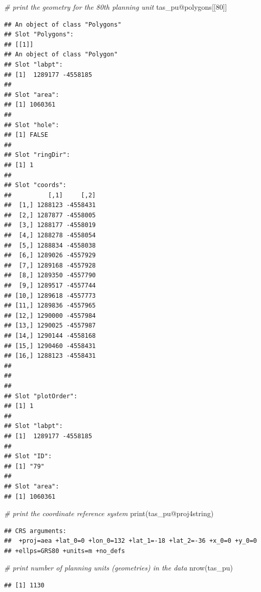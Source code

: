 \documentclass[
  12pt,
]{book}
\newenvironment{Shaded}{\begin{snugshade}}{\end{snugshade}}
\newcommand{\CommentTok}[1]{\textcolor[rgb]{0.56,0.35,0.01}{\textit{#1}}}
\newcommand{\DecValTok}[1]{\textcolor[rgb]{0.00,0.00,0.81}{#1}}
\newcommand{\FunctionTok}[1]{\textcolor[rgb]{0.00,0.00,0.00}{#1}}
\newcommand{\NormalTok}[1]{#1}
\newcommand{\SpecialCharTok}[1]{\textcolor[rgb]{0.00,0.00,0.00}{#1}}
\begin{document}
\begin{Shaded}
\begin{Highlighting}[]
\CommentTok{\# print the geometry for the 80th planning unit}
\NormalTok{tas\_pu}\SpecialCharTok{@}\NormalTok{polygons[[}\DecValTok{80}\NormalTok{]]}
\end{Highlighting}
\end{Shaded}

\begin{verbatim}
## An object of class "Polygons"
## Slot "Polygons":
## [[1]]
## An object of class "Polygon"
## Slot "labpt":
## [1]  1289177 -4558185
## 
## Slot "area":
## [1] 1060361
## 
## Slot "hole":
## [1] FALSE
## 
## Slot "ringDir":
## [1] 1
## 
## Slot "coords":
##          [,1]     [,2]
##  [1,] 1288123 -4558431
##  [2,] 1287877 -4558005
##  [3,] 1288177 -4558019
##  [4,] 1288278 -4558054
##  [5,] 1288834 -4558038
##  [6,] 1289026 -4557929
##  [7,] 1289168 -4557928
##  [8,] 1289350 -4557790
##  [9,] 1289517 -4557744
## [10,] 1289618 -4557773
## [11,] 1289836 -4557965
## [12,] 1290000 -4557984
## [13,] 1290025 -4557987
## [14,] 1290144 -4558168
## [15,] 1290460 -4558431
## [16,] 1288123 -4558431
## 
## 
## 
## Slot "plotOrder":
## [1] 1
## 
## Slot "labpt":
## [1]  1289177 -4558185
## 
## Slot "ID":
## [1] "79"
## 
## Slot "area":
## [1] 1060361
\end{verbatim}

\begin{Shaded}
\begin{Highlighting}[]
\CommentTok{\# print the coordinate reference system}
\FunctionTok{print}\NormalTok{(tas\_pu}\SpecialCharTok{@}\NormalTok{proj4string)}
\end{Highlighting}
\end{Shaded}

\begin{verbatim}
## CRS arguments:
##  +proj=aea +lat_0=0 +lon_0=132 +lat_1=-18 +lat_2=-36 +x_0=0 +y_0=0
## +ellps=GRS80 +units=m +no_defs
\end{verbatim}

\begin{Shaded}
\begin{Highlighting}[]
\CommentTok{\# print number of planning units (geometries) in the data}
\FunctionTok{nrow}\NormalTok{(tas\_pu)}
\end{Highlighting}
\end{Shaded}

\begin{verbatim}
## [1] 1130
\end{verbatim}
\end{document}
